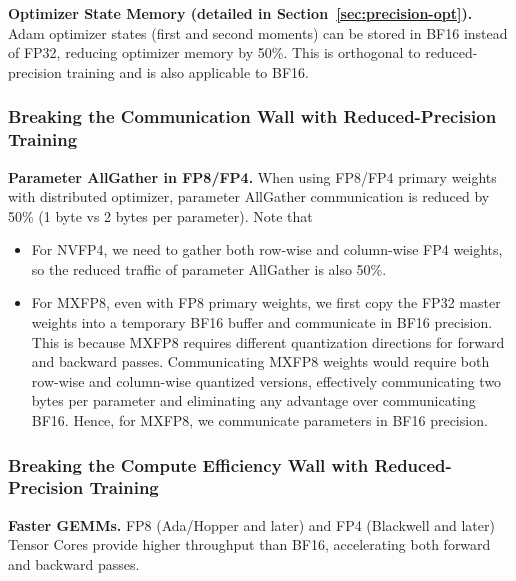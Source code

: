 \textbf{Optimizer State Memory (detailed in Section~\ref{sec:precision-opt}).} Adam optimizer states (first and second moments) can be stored in BF16 instead of FP32, reducing optimizer memory by 50\%. This is orthogonal to reduced-precision training and is also applicable to BF16.

\subsubsection{Breaking the Communication Wall with Reduced-Precision Training}
\label{sec:comm_wall_quantized_training}


\textbf{Parameter AllGather in FP8/FP4.} When using FP8/FP4 primary weights with distributed optimizer, parameter AllGather communication is reduced by 50\% (1 byte vs 2 bytes per parameter). Note that
\begin{itemize}
    \item For NVFP4, we need to gather both row-wise and column-wise FP4 weights, so the reduced traffic of parameter AllGather is also 50\%.
    \item For MXFP8, even with FP8 primary weights, we first copy the FP32 master weights into a temporary BF16 buffer and communicate in BF16 precision. This is because MXFP8 requires different quantization directions for forward and backward passes. Communicating MXFP8 weights would require both row-wise and column-wise quantized versions, effectively communicating two bytes per parameter and eliminating any advantage over communicating BF16. Hence, for MXFP8, we communicate parameters in BF16 precision. 
\end{itemize}

\subsubsection{Breaking the Compute Efficiency Wall with Reduced-Precision Training}

\textbf{Faster GEMMs.} FP8 (Ada/Hopper and later) and FP4 (Blackwell and later) Tensor Cores provide higher throughput than BF16, accelerating both forward and backward passes.

